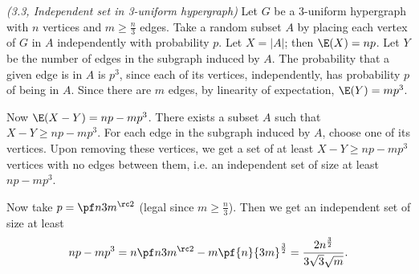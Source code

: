 \begin{problem} {\it (3.3, Independent set in 3-uniform hypergraph)}
Let $G$ be a 3-uniform hypergraph with $n$ vertices and $m\ge \frac n3$ edges. 
Take a random subset $A$ by placing each vertex of $G$ in $A$ independently with probability $p$. Let $X=|A|$; then $\E(X)=np$. 
Let $Y$ be the number of edges in the subgraph induced by $A$. The probability that a given edge is in $A$ is $p^3$, since each of its vertices, independently, has probability $p$ of being in $A$. Since there are $m$ edges, by linearity of expectation, $\E(Y)=mp^3$.

Now $\E(X-Y)=np-mp^3$. There exists a subset $A$ such that $X-Y\ge np-mp^3$. For each edge in the subgraph induced by $A$, choose one of its vertices. Upon removing these vertices, we get a set of at least $X-Y\ge np-mp^3$ vertices with no edges between them, i.e. an independent set of size at least $np-mp^3$.

Now take $p=\pf n{3m}^{\rc2}$ (legal since $m\ge \frac n3$). Then we get an independent set of size at least
\[
np-mp^3=n\pf n{3m}^{\rc 2}-m\pf{n}{3m}^{\frac 32}=\frac{2n^{\frac 32}}{3\sqrt 3 \sqrt m}.
\]
\end{problem}
